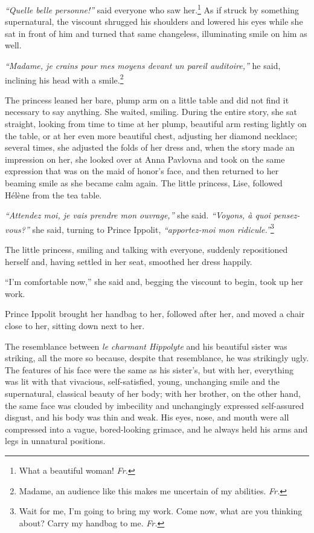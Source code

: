 \textit{``Quelle belle personne!''} said everyone who saw her.\footnote{What a beautiful woman! \textit{Fr.}} As if struck by something supernatural, the viscount shrugged his shoulders and lowered his eyes while she sat in front of him and turned that same changeless, illuminating smile on him as well.

\textit{``Madame, je crains pour mes moyens devant un pareil auditoire,''} he said, inclining his head with a smile.\footnote{Madame, an audience like this makes me uncertain of my abilities. \textit{Fr.}} %

The princess leaned her bare, plump arm on a little table and did not find it necessary to say anything. She waited, smiling. During the entire story, she sat straight, looking from time to time at her plump, beautiful arm resting lightly on the table, or at her even more beautiful chest, adjusting her diamond necklace; several times, she adjusted the folds of her dress and, when the story made an impression on her, she looked over at Anna Pavlovna and took on the same expression that was on the maid of honor's face, and then returned to her beaming smile as she became calm again. The little princess, Lise, followed H\'el\`ene from the tea table.

\textit{``Attendez moi, je vais prendre mon ouvrage,''} she said. \textit{``Voyons, \`a quoi pensez-vous?''} she said, turning to Prince Ippolit, \textit{``apportez-moi mon ridicule.''}\footnote{Wait for me, I'm going to bring my work. Come now, what are you thinking about? Carry my handbag to me. \textit{Fr.}} %

The little princess, smiling and talking with everyone, suddenly repositioned herself and, having settled in her seat, smoothed her dress happily.

``I'm comfortable now,'' she said and, begging the viscount to begin, took up her work. %

Prince Ippolit brought her handbag to her, followed after her, and moved a chair close to her, sitting down next to her.

The resemblance between \textit{le charmant Hippolyte} and his beautiful sister was striking, all the more so because, despite that resemblance, he was strikingly ugly. The features of his face were the same as his sister's, but with her, everything was lit with that vivacious, self-satisfied, young, unchanging smile and the supernatural, classical beauty of her body; with her brother, on the other hand, the same face was clouded by imbecility and unchangingly expressed self-assured disgust, and his body was thin and weak. His eyes, nose, and mouth were all compressed into a vague, bored-looking grimace, and he always held his arms and legs in unnatural positions.

